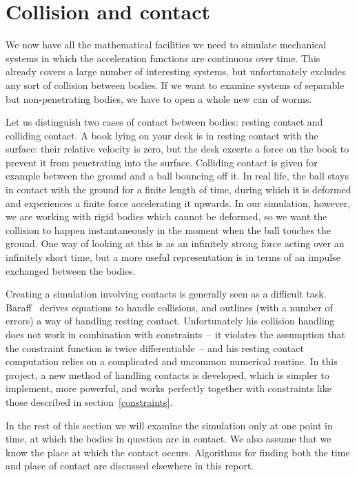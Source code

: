 \section{Collision and contact}

We now have all the mathematical facilities we need to simulate mechanical systems in which
the acceleration functions are continuous over time. This already covers a large number of
interesting systems, but unfortunately excludes any sort of collision between bodies. If we want
to examine systems of separable but non-penetrating bodies, we have to open a whole new can of
worms.

Let us distinguish two cases of contact between bodies: resting contact and colliding contact.
A book lying on your desk is in resting contact with the surface: their relative velocity is zero,
but the desk excerts a force on the book to prevent it from penetrating into the surface.
Colliding contact is given for example between the ground and a ball bouncing off it. In real
life, the ball stays in contact with the ground for a finite length of time, during which it is
deformed and experiences a finite force accelerating it upwards. In our simulation, however, we
are working with rigid bodies which cannot be deformed, so we want the collision to happen
instantaneously in the moment when the ball touches the ground. One way of looking at this is as
an infinitely strong force acting over an infinitely short time, but a more useful representation
is in terms of an impulse exchanged between the bodies.

Creating a simulation involving contacts is generally seen as a difficult task.
Baraff~\cite{BaraffWitkin:97} derives equations to handle collisions, and outlines (with a number
of errors) a way of handling resting contact. Unfortunately his collision handling does not work
in combination with constraints~-- it violates the assumption that the constraint function is
twice differentiable~-- and his resting contact computation relies on a complicated and uncommon
numerical routine. In this project, a new method of handling contacts is developed, which is
simpler to implement, more powerful, and works perfectly together with constraints like those
described in section~\ref{constraints}.

In the rest of this section we will examine the simulation only at one point in time, at which
the bodies in question are in contact. We also assume that we know the place at which the contact
occurs. Algorithms for finding both the time and place of contact are discussed elsewhere in this
report.

